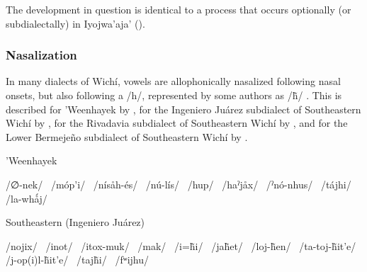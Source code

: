 The development in question is identical to a process that occurs optionally (or subdialectally) in Iyojwa’aja’ ().

\subsubsection{Nasalization}\label{wi-nasalization}

In many dialects of Wichí, vowels are allophonically nasalized following nasal onsets, but also following a /h/, represented by some authors as /h̃/ \citep{JT09-cap,LCB-MBC09}. This is described for ’Weenhayek by \citet[12–13]{KC94}, for the Ingeniero Juárez subdialect of Southeastern Wichí by \citet[100]{LCB-MBC09}, for the Rivadavia subdialect of Southeastern Wichí by \citet[78–79]{JT09-cap}, and for the Lower Bermejeño subdialect of Southeastern Wichí by \citet[41–42]{VN14}.

\ea
’Weenhayek \citep[12–13]{KC94}\\
    \begin{xlist}
        \ex /∅-nek/~
        \ex /móp’i/~
        \ex /nísåh-és/~
        \ex /nú-lís/~
        \ex /hup/~
        \ex /haˀjåx/~
        \ex /ˀnó-nhus/~
        \ex /tájhi/~
        \ex /la-whǻj/~
    \end{xlist}
\z

\ea
Southeastern (Ingeniero Juárez) \citep[100, 102–103]{LCB-MBC09}\\
    \begin{xlist}
        \ex /nojix/~
        \ex /inot/~
        \ex /itox-muk/~
        \ex /mak/~
        \ex /i=h̃i/~
        \ex /jah̃et/~
        \ex /loj-h̃en/~
        \ex /ta-toj-h̃it’e/~
        \ex /j-op(i)l-h̃it’e/~
        \ex /tajh̃i/~
        \ex /fʷijhu/~
    \end{xlist}
\z

